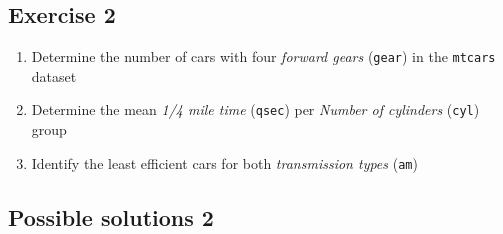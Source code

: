 \documentclass[
  letterpaper,
]{book}
\newenvironment{Shaded}{}{}
\begin{document}
\hypertarget{exercise-2}{%
\subsection{Exercise 2}\label{exercise-2}}

\begin{enumerate}
\def\labelenumi{\arabic{enumi}.}
\item
  Determine the number of cars with four \emph{forward gears}
  (\texttt{gear}) in the \texttt{mtcars} dataset

\begin{Shaded}
\begin{Highlighting}[]

\end{Highlighting}
\end{Shaded}
\item
  Determine the mean \emph{1/4 mile time} (\texttt{qsec}) per
  \emph{Number of cylinders} (\texttt{cyl}) group

\begin{Shaded}
\begin{Highlighting}[]

\end{Highlighting}
\end{Shaded}
\item
  Identify the least efficient cars for both \emph{transmission types}
  (\texttt{am})

\begin{Shaded}
\begin{Highlighting}[]

\end{Highlighting}
\end{Shaded}
\end{enumerate}

\hypertarget{possible-solutions-2}{%
\subsection{Possible solutions 2}\label{possible-solutions-2}}
\end{document}

